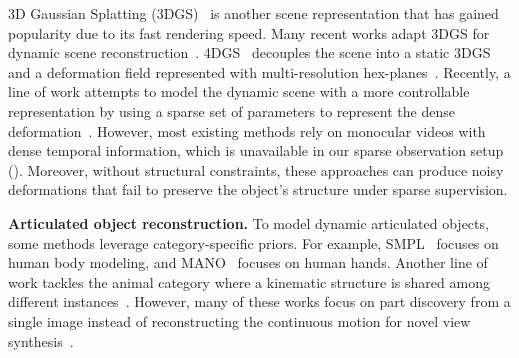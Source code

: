 3D Gaussian Splatting (3DGS)~\cite{kerbl3Dgaussians} is another scene representation that has gained popularity due to its fast rendering speed. Many recent works adapt 3DGS for dynamic scene reconstruction~\cite{luiten2024dynamic,Wu_2024_CVPR,wan2024superpoint,huang2024sc,liu2025modgs,yang2024deformable,kerbl3Dgaussians, kratimenos2024dynmf}. 
4DGS~\cite{Wu_2024_CVPR} decouples the scene into a static 3DGS and a deformation field represented with multi-resolution hex-planes~\cite{cao2023hexplane}. Recently, a line of work attempts to model the dynamic scene with a more controllable representation by using a sparse set of parameters to represent the dense deformation~\cite{wan2024superpoint, huang2024sc}.
However, most existing methods rely on monocular videos with dense temporal information, which is unavailable in our sparse observation setup (). Moreover, without structural constraints, these approaches can produce noisy deformations that fail to preserve the object’s structure under sparse supervision.

\par
\vspace{6pt}
\noindent\textbf{Articulated object reconstruction.}
To model dynamic articulated objects, some methods leverage category-specific priors. For example, SMPL~\cite{SMPL:2015} focuses on human body modeling, and MANO~\cite{romero2017embodied} focuses on human hands. Another line of work tackles the animal category where a kinematic structure is shared among different instances~\cite{zuffi20173d, wu2022casa, yao2022lassie, NEURIPS2023_a99f50fb, wu2023magicpony, lei2024gart}. However, many of these works focus on part discovery from a single image instead of reconstructing the continuous motion for novel view synthesis~\cite{NEURIPS2023_a99f50fb, yao2022lassie,wu2023magicpony}. 


